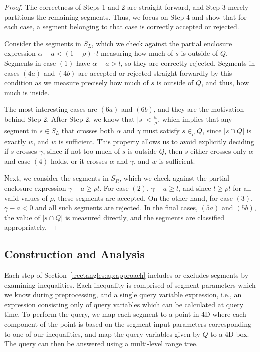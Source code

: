 \begin{proof}
The correctness of Steps 1 and 2 are straight-forward, and Step 3 merely partitions the remaining segments. Thus, we focus on Step 4 and show that for each case, a segment belonging to that case is correctly accepted or rejected.

Consider the segments in $S_L$, which we check against the partial enclosure expression $\alpha - a < (1 - \rho) \cdot l$ measuring how much of $s$ is outside of $Q$. 
Segments in case $(1)$ have $\alpha - a > l$, so they are correctly rejected. 
Segments in cases $(4a)$ and $(4b)$ are accepted or rejected straight-forwardly by this condition as we measure precisely how much of $s$ is outside of $Q$, and thus, how much is inside. 

The most interesting cases are $(6a)$ and $(6b)$, and they are the motivation behind Step 2.  After Step 2, we know that $|s| < \frac{w}{\rho}$, which implies that any segment in $s \in S_L$ that crosses both $\alpha$ and $\gamma$ must satisfy $s \in_\rho Q$, since $|s \cap Q|$ is exactly $w$, and $w$ is sufficient. This property allows us to avoid explicitly deciding if $s$ crosses $\gamma$, since if not too much of $s$ is outside $Q$, then $s$ either crosses only $\alpha$ and case $(4)$ holds, or it crosses $\alpha$ and $\gamma$, and $w$ is sufficient.

Next, we consider the segments in $S_R$, which we check against the partial enclosure expression $\gamma - a \geq  \rho l$. 
For case $(2)$, $\gamma - a \geq l$, and since $l \geq \rho l$ for all valid values of $\rho$, these segments are accepted.
On the other hand, for case $(3)$, $\gamma - a < 0$ and all such segments are rejected. 
In the final cases, $(5a)$ and $(5b)$, the value of $|s \cap Q|$ is measured directly, and the segments are classified appropriately.

\end{proof}


\subsection{Construction and Analysis}
\label{:rectangles:ap:analysis}

Each step of Section~\ref{:rectangles:ap:approach} includes or excludes segments by examining inequalities.
Each inequality is comprised of segment parameters which we know during preprocessing, and a single query variable expression, i.e., an expression consisting only of query variables which can be calculated at query time. 
To perform the query, we map each segment to a point in 4D where each component of the point is based on the segment input parameters corresponding to one of our inequalities, and map the query variables given by $Q$ to a 4D box.
The query can then be answered using a multi-level range tree.

